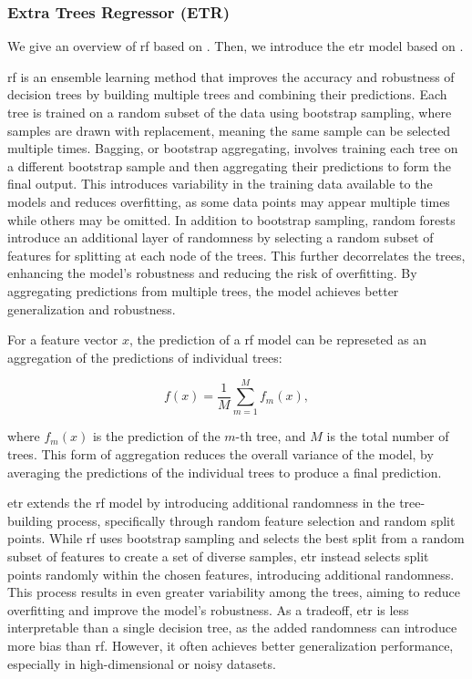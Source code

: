 \subsubsection{Extra Trees Regressor (ETR)}
We give an overview of \gls{rf} based on \citet{James2023AnIS}.
Then, we introduce the \gls{etr} model based on \citet{geurtsERF}.

\gls{rf} is an ensemble learning method that improves the accuracy and robustness of decision trees by building multiple trees and combining their predictions.
Each tree is trained on a random subset of the data using bootstrap sampling, where samples are drawn with replacement, meaning the same sample can be selected multiple times.
Bagging, or bootstrap aggregating, involves training each tree on a different bootstrap sample and then aggregating their predictions to form the final output.
This introduces variability in the training data available to the models and reduces overfitting, as some data points may appear multiple times while others may be omitted.
In addition to bootstrap sampling, random forests introduce an additional layer of randomness by selecting a random subset of features for splitting at each node of the trees.
This further decorrelates the trees, enhancing the model's robustness and reducing the risk of overfitting.
By aggregating predictions from multiple trees, the model achieves better generalization and robustness.

For a feature vector $x$, the prediction of a \gls{rf} model can be represeted as an aggregation of the predictions of individual trees:

$$
f(x) = \frac{1}{M} \sum_{m=1}^{M} f_m(x),
$$

where $f_m(x)$ is the prediction of the $m$-th tree, and $M$ is the total number of trees.
This form of aggregation reduces the overall variance of the model, by averaging the predictions of the individual trees to produce a final prediction.

\gls{etr} extends the \gls{rf} model by introducing additional randomness in the tree-building process, specifically through random feature selection and random split points.
While \gls{rf} uses bootstrap sampling and selects the best split from a random subset of features to create a set of diverse samples, \gls{etr} instead selects split points randomly within the chosen features, introducing additional randomness.
This process results in even greater variability among the trees, aiming to reduce overfitting and improve the model's robustness.
As a tradeoff, \gls{etr} is less interpretable than a single decision tree, as the added randomness can introduce more bias than \gls{rf}.
However, it often achieves better generalization performance, especially in high-dimensional or noisy datasets.